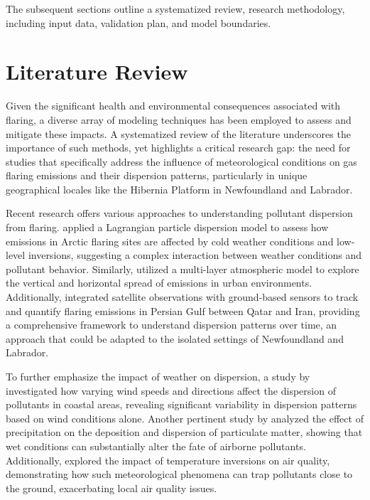 The subsequent sections outline a systematized review, research methodology, including input data, validation plan, and model boundaries.



\section{Literature Review}
Given the significant health and environmental consequences associated with flaring, a diverse array of modeling techniques has been employed to assess and mitigate these impacts. A systematized review of the literature underscores the importance of such methods, yet highlights a critical research gap: the need for studies that specifically address the influence of meteorological conditions on gas flaring emissions and their dispersion patterns, particularly in unique geographical locales like the Hibernia Platform in Newfoundland and Labrador.

Recent research offers various approaches to understanding pollutant dispersion from flaring. \cite{popovicheva2022siberian} applied a Lagrangian particle dispersion model to assess how emissions in Arctic flaring sites are affected by cold weather conditions and low-level inversions, suggesting a complex interaction between weather conditions and pollutant behavior. Similarly, \cite{miao2014multi} utilized a multi-layer atmospheric model to explore the vertical and horizontal spread of emissions in urban environments. Additionally, \cite{caseiro2023quantification} integrated satellite observations with ground-based sensors to track and quantify flaring emissions in Persian Gulf between Qatar and Iran, providing a comprehensive framework to understand dispersion patterns over time, an approach that could be adapted to the isolated settings of Newfoundland and Labrador.

To further emphasize the impact of weather on dispersion, a study by \cite{fawole2019dispersion,nwosisi2020dispersion} investigated how varying wind speeds and directions affect the dispersion of pollutants in coastal areas, revealing significant variability in dispersion patterns based on wind conditions alone. Another pertinent study by \cite{henao2017direct} analyzed the effect of precipitation on the deposition and dispersion of particulate matter, showing that wet conditions can substantially alter the fate of airborne pollutants. Additionally, \cite{wallace2010topographic} explored the impact of temperature inversions on air quality, demonstrating how such meteorological phenomena can trap pollutants close to the ground, exacerbating local air quality issues.

